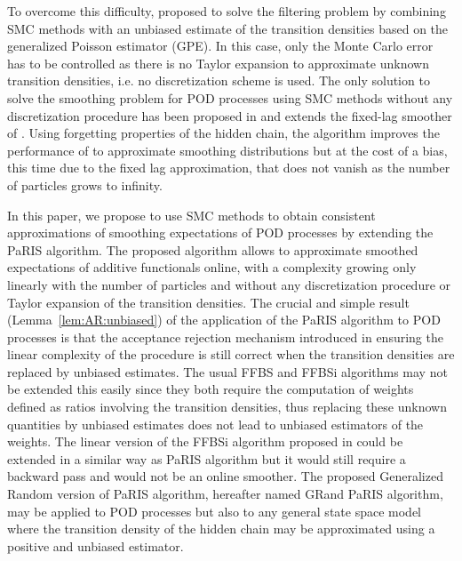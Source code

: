 \documentclass[12pt]{article}
\newcommand{\1}{\mathrm{1}}
\begin{document}
To overcome this difficulty, \cite{fearnhead:papaspiliopoulos:roberts:2008} proposed to solve the filtering problem by combining SMC methods with an unbiased estimate of the transition densities based on the generalized Poisson estimator (GPE). 
     In this case, only the Monte Carlo error has to be controlled as there is no Taylor expansion to approximate unknown transition densities, i.e. no discretization scheme is used. The only solution to solve the smoothing problem for POD processes using SMC methods without any discretization procedure has been proposed in \cite{olsson:strojby:2011} and extends the fixed-lag smoother of \cite{olsson:cappe:douc:moulines:2008}. 
 Using forgetting properties of the hidden chain, the algorithm improves the performance of \cite{fearnhead:papaspiliopoulos:roberts:2008} to approximate smoothing distributions but at the cost of a bias, this time due to the fixed lag approximation, that does not vanish as the number of particles grows to infinity.
 
In this paper, we propose to use SMC methods to obtain consistent approximations of smoothing expectations of POD processes by extending the PaRIS algorithm.
The proposed algorithm allows to approximate smoothed expectations of additive functionals online, with a complexity growing only linearly with the number of particles and without any discretization procedure or Taylor expansion of the transition densities.
 The crucial and simple result (Lemma~\ref{lem:AR:unbiased}) of the application of the PaRIS algorithm to POD processes is that the acceptance rejection mechanism introduced in \cite{douc:garivier:moulines:olsson:2011} ensuring the linear complexity of the procedure is still correct when the transition densities are replaced by unbiased estimates. 
 The usual FFBS and FFBSi algorithms may not be extended this easily since they both require the computation of weights defined as ratios involving the transition densities, thus replacing these unknown quantities by unbiased estimates does not lead to unbiased estimators of the weights. 
 The linear version of the FFBSi algorithm proposed in \cite{douc:garivier:moulines:olsson:2011} could be extended in a similar way as PaRIS algorithm but it would still require a backward pass and would not be an online smoother. 
 The proposed Generalized Random version of PaRIS algorithm, hereafter named GRand PaRIS algorithm, may be applied to POD processes but also to any general state space model where the transition density of the hidden chain may be approximated using a positive and unbiased estimator.
\end{document}
